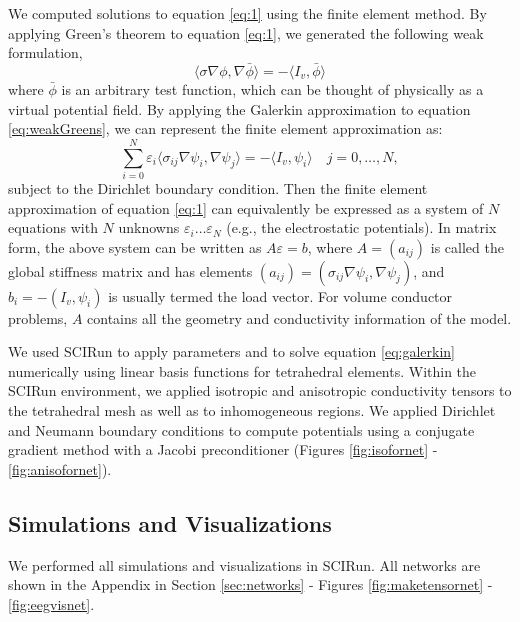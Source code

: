 We computed solutions to equation \ref{eq:1} using the finite element method. By applying Green's theorem to equation \ref{eq:1}, we generated the following weak formulation,
\begin{equation}
\label{eq:weakGreens}
\langle \sigma \nabla \phi, \nabla \bar{\phi} \rangle = -\langle I_v, \bar{\phi} \rangle
\end{equation}
where $ \bar{\phi}$ is an arbitrary test function, which can be thought of physically as a virtual potential field. By applying the Galerkin approximation to equation \ref{eq:weakGreens}, we can represent the finite element approximation as:
\begin{equation}
\label{eq:galerkin}
\sum_{i = 0}^{N} \varepsilon_i \langle \sigma_{ij} \nabla \psi_{i}, \nabla \psi_{j} \rangle = -\langle I_v, \psi_i \rangle \quad j = 0, \dots, N,
\end{equation}
subject to the Dirichlet boundary condition. Then the finite element approximation of equation \ref{eq:1} can equivalently be expressed as a system of $N$ equations with $N$ unknowns $\varepsilon_i \dots \varepsilon_N$ (e.g., the electrostatic potentials). In matrix form, the above system can be written as $A \varepsilon = b$,  where $A=(a_{ij})$ is called the global stiffness matrix and has elements $(a_{ij}) = (\sigma_{ij} \nabla \psi_{i}, \nabla \psi_{j})$, and $b_i = -(I_v, \psi_i)$ is usually termed the load vector. For volume conductor problems, $A$ contains all the geometry and conductivity information of the model. \cite{SCI:Joh2015c}

We used SCIRun to apply parameters and to solve equation \ref{eq:galerkin} numerically using linear basis functions for tetrahedral elements. Within the SCIRun environment, we applied isotropic and anisotropic conductivity tensors to the tetrahedral mesh as well as to inhomogeneous regions. We applied Dirichlet and Neumann boundary conditions to compute potentials using a conjugate gradient method with a Jacobi preconditioner (Figures \ref{fig:isofornet} - \ref{fig:anisofornet}).

\subsection{Simulations and Visualizations}
\label{sec:sim}

We performed all simulations and visualizations in SCIRun. All networks are shown in the Appendix in Section \ref{sec:networks} - Figures \ref{fig:maketensornet} - \ref{fig:eegvisnet}.

